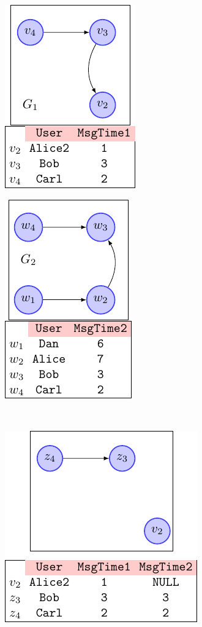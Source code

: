 \begin{figure}[!ph]
	\centering
	\begin{adjustbox}{max width=\textwidth}
		\begin{minipage}[b]{.25\textwidth}
			\includegraphics[scale=0.8]{fig/03joins/g1_mod_tab.pdf}
			\label{fig:figjoing1bisa}
		\end{minipage}
		\begin{minipage}[b]{.25\textwidth}
			\includegraphics[scale=0.8]{fig/03joins/g2_mod_tab}
			\label{fig:figjoing2bis}
		\end{minipage}
	\end{adjustbox}\\
	\begin{minipage}[b]{.3\linewidth}
		\centering
		\includegraphics[scale=0.8]{fig/03joins/cong_left}

\end{minipage}
\end{figure}
